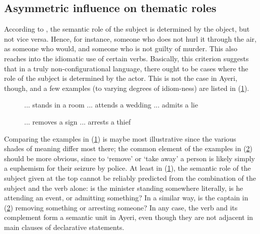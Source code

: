 \subsection{Asymmetric influence on thematic roles}

According to \citet[129]{speas1990}, the semantic role of the subject is
determined by the object, but not vice versa. Hence, for instance, someone who
 does not hurl it through the air, as someone who
 would, and someone who  is not guilty of
murder. This also reaches into the idiomatic use of certain verbs. Basically,
this criterion suggests that in a truly non-configurational language, there
ought to be cases where the role of the subject is determined by the actor.
This is not the case in Ayeri, though, and a few examples (to varying degrees
of idiom-ness) are listed in (\ref{ex:ayrvbidm1}).

\begin{figure}[h]
\pex\label{ex:ayrvbidm1}%
\a {}
	{... stands in a room}
\a {}
	{... attends a wedding}
\a {}
	{... admits a lie}
\xe
\end{figure}

\begin{figure}[h]
\pex\label{ex:ayrvbidm2}%
\a {}
	{... removes a sign}
\a {}
	{... arrests a thief}
\xe
\end{figure}

Comparing the examples in (\ref{ex:ayrvbidm1}) is maybe most illustrative since
the various shades of meaning differ most there; the common element of the
examples in (\ref{ex:ayrvbidm2}) should be more obvious, since to `remove' or
`take away' a person is likely simply a euphemism for their seizure by police.
At least in (\ref{ex:ayrvbidm1}), the semantic role of the subject given at the
top cannot be reliably predicted from the combination of the subject and the
verb alone: is the minister standing somewhere literally, is he attending an
event, or admitting something? In a similar way, is the captain in
(\ref{ex:ayrvbidm2}) removing something or arresting someone? In any case, the
verb and its complement form a semantic unit in Ayeri, even though they are not
adjacent in main clauses of declarative statements.

